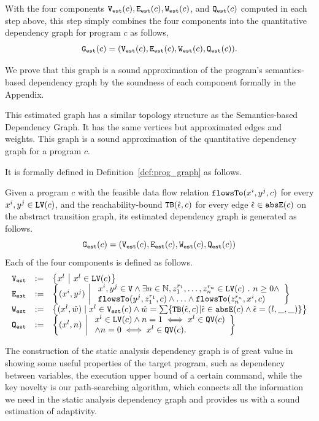 With the four components $\mathtt{{V_{est}}}(c), \mathtt{{E_{est}}}(c), \mathtt{{W_{est}}}(c)$, and $\mathtt{{Q_{est}}}(c)$
computed in each step above, this step simply combines the four components into the quantitative dependency graph for program $c$ as follows,
 \[
 \mathtt{{G_{est}}}(c) = (\mathtt{{V_{est}}}(c), \mathtt{{E_{est}}}(c), \mathtt{{W_{est}}}(c), \mathtt{{Q_{est}}}(c)).
 \]

 We prove that this graph is a sound approximation of the program's semantics-based dependency graph by the soundness of each component formally in the Appendix.

This estimated graph has a similar topology structure as 
the Semantics-based Dependency Graph. It has the same
vertices 
but approximated edges and weights. 
This graph is a sound approximation of the quantitative dependency graph for a program $c$.

It is formally defined in Definition~\ref{def:prog_graph} as follows.

\begin{defn}
\label{def:prog_graph}
Given a program $c$ 
% 
with the feasible data flow relation $\mathtt{flowsTo}(x^i, y^j, c)$ for every $x^i, y^j \in \mathtt{LV}(c)$, 
and the reachability-bound ${\mathtt{TB}}(\hat{\mathtt{\epsilon}{}}, c)$ for every edge $\hat{\mathtt{\epsilon}{}} \in \mathtt{abs}{\mathtt{E}}(c)$ on the abstract transition graph,
its estimated dependency graph
is generated as follows.
\[\mathtt{{G_{est}}}(c) = (\mathtt{{V_{est}}}(c), \mathtt{{E_{est}}}(c), \mathtt{{W_{est}}}(c), \mathtt{{Q_{est}}}(c))\]
Each of the four components is defined as follows.
{\small
\[
\begin{array}{lll}
\progV & := & \left\{ 
x^l
~ \middle\vert ~
x^l \in \lvar(c)
\right\}
\\
\progE & := & 
\left\{ 
(x^i, y^j) 
~ \middle\vert ~
\begin{array}{l}
x^i, y^j \in \vertxs
\land
\exists n \in \mathbb{N}, z_1^{r_1}, \ldots, z_n^{r_n} \in \lvar(c) \sthat
n \geq 0 \land
\\
\flowsto(y^j, z_1^{r_1}, c) 
\land \ldots \land \flowsto(z_n^{r_n}, x^i, c) 
\end{array}
\right\}
\\
\progW & := &
\left\{ (x^l, \hat{w}) 
\mid
x^l \in \progV(c) \land 
\hat{w} = 
\sum\left\{ \absclr(\absevent, c) \middle\vert \absevent \in \absE(c) \land \absevent = (l, \_, \_) \right\}
\right\}
\\
\progF & := & 
\left\{(x^l, n) 
~ \middle\vert ~
\begin{array}{l}
 x^l \in \lvar(c) \land
 n = 1 \iff x^l \in \qvar(c) \\
\land n = 0 \iff x^l \in \qvar(c) .
\end{array}
\right\}
\end{array}
\] }
\end{defn}
The construction of the static analysis dependency graph is of great value in showing some useful properties of the target program,
such as dependency between variables, the execution upper bound of a certain command,
while the key novelty is our path-searching algorithm, which connects all the information we need in the static analysis dependency graph and provides us with a sound estimation of adaptivity.

